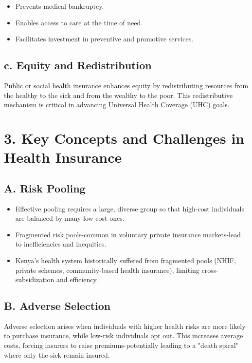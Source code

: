 \documentclass[10pt]{article}
\begin{document}
\begin{itemize}
  \item Prevents medical bankruptcy.
  \item Enables access to care at the time of need.
  \item Facilitates investment in preventive and promotive services.
\end{itemize}

\subsection*{c. Equity and Redistribution}
Public or social health insurance enhances equity by redistributing resources from the healthy to the sick and from the wealthy to the poor. This redistributive mechanism is critical in advancing Universal Health Coverage (UHC) goals.

\section*{3. Key Concepts and Challenges in Health Insurance}
\subsection*{A. Risk Pooling}
\begin{itemize}
  \item Effective pooling requires a large, diverse group so that high-cost individuals are balanced by many low-cost ones.
\end{itemize}

\begin{itemize}
  \item Fragmented risk pools-common in voluntary private insurance markets-lead to inefficiencies and inequities.
\end{itemize}

\begin{itemize}
  \item Kenya's health system historically suffered from fragmented pools (NHIF, private schemes, community-based health insurance), limiting cross-subsidization and efficiency.
\end{itemize}

\subsection*{B. Adverse Selection}
\begin{definition}
	Adverse selection arises when individuals with higher health risks are more likely to purchase insurance, while low-risk individuals opt out. This increases average costs, forcing insurers to raise premiums-potentially leading to a "death spiral" where only the sick remain insured.
\end{definition}
\end{document}
